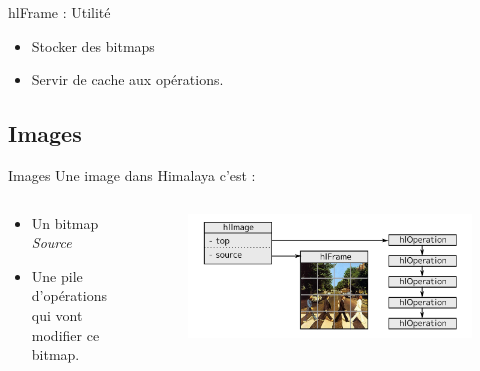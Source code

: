 \documentclass[slidetop,compress,mathserif]{beamer}
\begin{document}
	\begin{frame}{hlFrame : Utilité}
		\begin{itemize}
			\pause \item Stocker des bitmaps
			\pause \item Servir de cache aux opérations.
		\end{itemize}
	\end{frame}

	\subsection{Images}
	\begin{frame}{Images}
		Une image dans Himalaya c'est :
		\begin{columns}
			\begin{column}{0.3\textwidth}
				\begin{itemize}
					\item Un bitmap \emph{Source}
					\item Une pile d'opérations qui vont modifier ce bitmap.
				\end{itemize}
			\end{column}
			\begin{column}{0.7\textwidth}
				\pause
				\begin{figure}[h]
					\includegraphics[width=\textwidth]{images/hlImage1}
				\end{figure}
			\end{column}
		\end{columns}
	\end{frame}	
\end{document}
